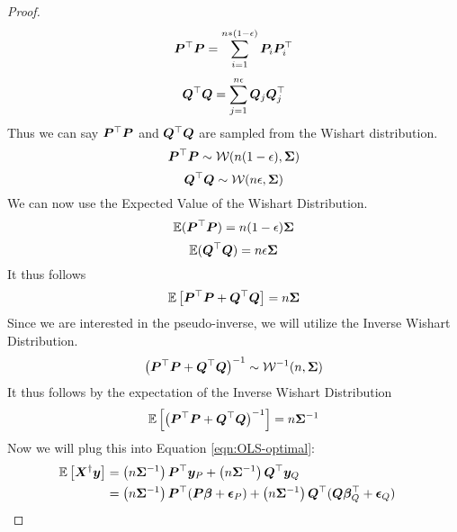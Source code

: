 \documentclass{article} %
\begin{document}
\begin{appendices}
\begin{proof}
	\begin{equation}
		{\bm{P}}^\top{\bm{P}} = \sum_{i=1}^{n*(1-{\epsilon})}{\bm{P}}_i{\bm{P}}_i^\top
	\end{equation}
	\begin{equation}
		{\bm{Q}}^\top{\bm{Q}} = \sum_{j=1}^{n{\epsilon}}{\bm{Q}}_j{\bm{Q}}_j^\top
	\end{equation}\vspace{1em}
	Thus we can say ${\bm{P}}^\top{\bm{P}}$ and ${\bm{Q}}^\top{\bm{Q}}$ are sampled from the Wishart distribution.
	\begin{equation}
		{\bm{P}}^\top{\bm{P}} \sim \mathcal{W}(n(1-{\epsilon}),{\bm{\Sigma}})
	\end{equation}
	\begin{equation}\vspace{1em}
		\mQ^\top\mQ \sim \mathcal{W}(n\eps,\mSigma)
	\end{equation}
	We can now use the Expected Value of the Wishart Distribution.\vspace{1em}
	\begin{equation}
		\mathbb{E}({\bm{P}}^\top{\bm{P}}) = n(1-{\epsilon}){\bm{\Sigma}}
	\end{equation}
	\begin{equation}\vspace{1em}
		\mathbb{E}(\mQ^\top\mQ) = n\eps\mSigma
	\end{equation}
	It thus follows
	\begin{equation}\vspace{1em}
		\mathbb{E}\left[\mP^\top\mP + \mQ^\top\mQ\right] = n\mSigma
	\end{equation}
	Since we are interested in the pseudo-inverse, we will utilize the Inverse Wishart Distribution. 
	\begin{equation}
		\left({\bm{P}}^\top{\bm{P}} + {\bm{Q}}^\top{\bm{Q}}\right)^{-1} \sim \mathcal{W}^{-1}(n, {\bm{\Sigma}})
	\end{equation}
	It thus follows by the expectation of the Inverse Wishart Distribution 
	\begin{equation}
		\mathbb{E}\left[\left({\bm{P}}^\top{\bm{P}} + {\bm{Q}}^\top{\bm{Q}}\right)^{-1}\right] = n{\bm{\Sigma}}^{-1}
	\end{equation}
	Now we will plug this into Equation \ref{eqn:OLS-optimal}:\vspace{1em}
	\begin{align}\vspace{1em}
		\mathbb{E}\left[\mX^{\dagger}\vy\right] &= \left(n\mSigma^{-1}\right)\mP^\top\vy_P + \left(n\mSigma^{-1}\right)\mQ^\top\vy_Q &&\\
		&= \left(n\mSigma^{-1}\right)\mP^\top(\mP\vbeta + \veps_P) + \left(n\mSigma^{-1}\right)\mQ^\top(\mQ\vbeta_Q^\top + \veps_Q) &&\\

\end{align}
\end{proof}
\end{appendices}
\end{document}
